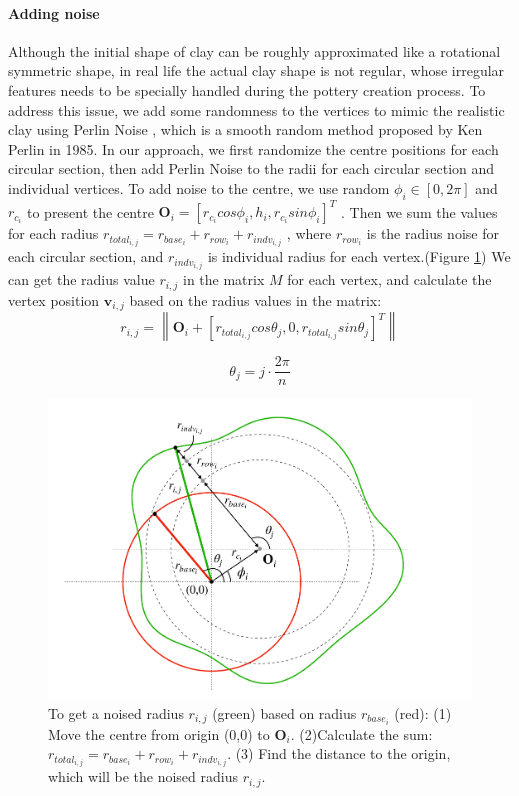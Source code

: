\paragraph{Adding noise} Although the initial shape of clay can be roughly approximated like a rotational symmetric shape, in real life the actual clay shape is not regular, whose irregular features needs to be specially handled during the pottery creation process. To address this issue, we add some randomness to the vertices to mimic the realistic clay using Perlin Noise \cite{Perlin1985An}, which is a smooth random method proposed by Ken Perlin in 1985.
In our approach, we first randomize the centre positions for each circular section, then add Perlin Noise to the radii for each circular section and individual vertices.
To add noise to the centre, we use random $\phi_{i} \in [0, 2\pi]$ and $r_{c_{i}}$ to present the centre
$\mathbf{O}_{i} = \left[r_{c_{i}}cos\phi_{i}, h_{i}, r_{c_{i}}sin\phi_{i}\right]^T$
. Then we sum the values for each radius
$r_{total_{i,j}} = r_{base_{i}} + r_{row_{i}} + r_{indv_{i,j}}$
, where $r_{row_{i}}$ is the radius noise for each circular section, and $r_{indv_{i,j}}$ is individual radius for each vertex.(Figure \ref{fig:4}) We can get the radius value $r_{i,j}$ in the matrix $M$ for each vertex, and calculate the vertex position $\mathbf{v}_{i,j}$ based on the radius values in the matrix:
\begin{equation}
r_{i,j} = \left\|
\mathbf{O}_{i} + \left[ r_{total_{i,j}} cos \theta_{j},
0,
r_{total_{i,j}} sin \theta_{j}
\right]^T
\right\| 
\end{equation}

\begin{equation}
\theta_{j} = j \cdot \frac{2\pi}{n}
\end{equation}

\begin{figure}
\includegraphics[width=\textwidth]{fig4.pdf}
\caption{To get a noised radius $r_{i,j}$ (green) based on radius $r_{base_{i}}$ (red): (1) Move the centre from origin (0,0) to $\mathbf{O}_{i}$. (2)Calculate the sum: $r_{total_{i,j}} = r_{base_{i}} + r_{row_{i}} + r_{indv_{i,j}}$. (3) Find the distance to the origin, which will be the noised radius $r_{i,j}$.}
\label{fig:4}
\end{figure}


